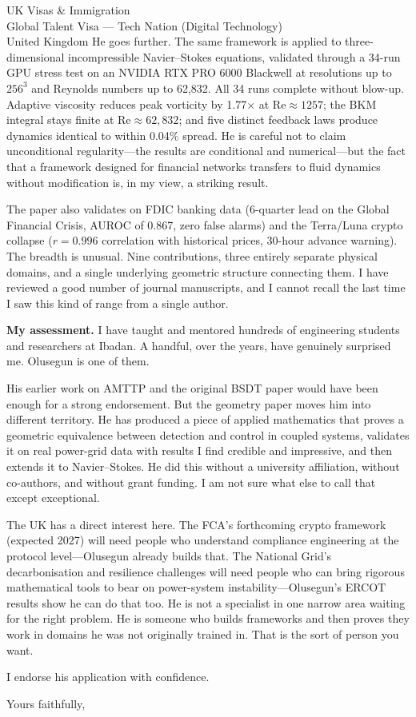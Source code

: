 \documentclass[12pt,a4paper]{letter}
\begin{document}
\begin{letter}{UK Visas \& Immigration\\
Global Talent Visa --- Tech Nation (Digital Technology)\\
United Kingdom}
He goes further. The same framework is applied to three-dimensional incompressible Navier--Stokes equations, validated through a 34-run GPU stress test on an NVIDIA RTX PRO 6000 Blackwell at resolutions up to $256^3$ and Reynolds numbers up to 62,832. All 34 runs complete without blow-up. Adaptive viscosity reduces peak vorticity by 1.77$\times$ at $\mathrm{Re} \approx 1257$; the BKM integral stays finite at $\mathrm{Re} \approx 62{,}832$; and five distinct feedback laws produce dynamics identical to within 0.04\% spread. He is careful not to claim unconditional regularity---the results are conditional and numerical---but the fact that a framework designed for financial networks transfers to fluid dynamics without modification is, in my view, a striking result.

The paper also validates on FDIC banking data (6-quarter lead on the Global Financial Crisis, AUROC of 0.867, zero false alarms) and the Terra/Luna crypto collapse ($r = 0.996$ correlation with historical prices, 30-hour advance warning). The breadth is unusual. Nine contributions, three entirely separate physical domains, and a single underlying geometric structure connecting them. I have reviewed a good number of journal manuscripts, and I cannot recall the last time I saw this kind of range from a single author.

\textbf{My assessment.} I have taught and mentored hundreds of engineering students and researchers at Ibadan. A handful, over the years, have genuinely surprised me. Olusegun is one of them.

His earlier work on AMTTP and the original BSDT paper would have been enough for a strong endorsement. But the geometry paper moves him into different territory. He has produced a piece of applied mathematics that proves a geometric equivalence between detection and control in coupled systems, validates it on real power-grid data with results I find credible and impressive, and then extends it to Navier--Stokes. He did this without a university affiliation, without co-authors, and without grant funding. I am not sure what else to call that except exceptional.

The UK has a direct interest here. The FCA's forthcoming crypto framework (expected 2027) will need people who understand compliance engineering at the protocol level---Olusegun already builds that. The National Grid's decarbonisation and resilience challenges will need people who can bring rigorous mathematical tools to bear on power-system instability---Olusegun's ERCOT results show he can do that too. He is not a specialist in one narrow area waiting for the right problem. He is someone who builds frameworks and then proves they work in domains he was not originally trained in. That is the sort of person you want.

I endorse his application with confidence.

\vspace{1.5\baselineskip}

\closing{Yours faithfully,}

\end{letter}
\end{document}
